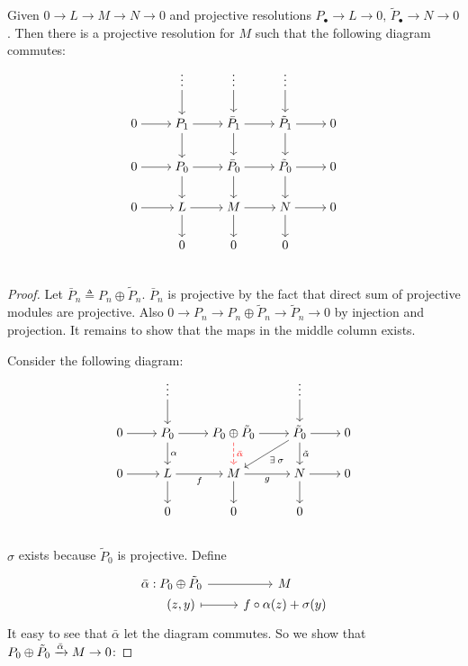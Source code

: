 \begin{theorem} \label{thm:horseshoe-lemma}
  Given $0 \to L \to M \to N \to 0$ and projective resolutions
  $P_\bullet \to L \to 0, \, \tilde P_\bullet \to N \to 0$.
  Then there is a projective resolution for $M$ such that
  the following diagram commutes:
  \[ \begin{tikzcd}[cramped]
      & \vdots \ar[d] & \vdots \ar[d] & \vdots \ar[d] & \\
      0 \ar[r] & P_1 \ar[r] \ar[d] & \bar P_1 \ar[r] \ar[d] & \tilde P_1 \ar[r] \ar[d] & 0 \\
      0 \ar[r] & P_0 \ar[r] \ar[d] & \bar P_0 \ar[r] \ar[d] & \tilde P_0 \ar[r] \ar[d] & 0 \\
      0 \ar[r] & L   \ar[r] \ar[d] & M        \ar[r] \ar[d] & N          \ar[r] \ar[d] & 0 \\
               & 0 & 0 & 0 & \\
  \end{tikzcd} \]

  \begin{proof}
    Let $\bar P_n \triangleq P_n \oplus \tilde P_n$. $\bar P_n$ is projective
    by the fact that direct sum of projective modules are projective. Also
    $0 \to P_n \to P_n \oplus \tilde P_n \to \tilde P_n \to 0$ by
    injection and projection. It remains to show that the
    maps in the middle column exists.

    Consider the following diagram:
    \[ \begin{tikzcd}[cramped]
        & \vdots \ar[d] &  & \vdots \ar[d] & \\
        0 \ar[r] &
        P_0 \ar[r] \ar[d, "\alpha"] &
        P_0 \oplus \tilde P_0 \ar[r] \ar[d, red, "\bar \alpha" red, dashed] &
        \tilde P_0 \ar[r] \ar[d, "\tilde \alpha"] \ar[ld, "\exists \sigma"] & 0 \\
        0 \ar[r] & L \ar[r, "f"'] \ar[d] &
        M \ar[r, "g"'] \ar[d] &
        N \ar[r] \ar[d] & 0 \\
        & 0 & 0 & 0 & \\
    \end{tikzcd} \]
    $\sigma$ exists because $\tilde P_0$ is projective.
    Define
    \[ \begin{tikzcd}[row sep=0pt]
        \bar\alpha : &[-3em] P_0 \oplus \tilde P_0 \ar[r] & M \\
                     &[-3em] (z, y) \ar[r, mapsto] & f \circ \alpha(z) + \sigma(y)
    \end{tikzcd} \]
    It easy to see that $\bar \alpha$ let the diagram commutes.
    So we show that $P_0 \oplus \tilde P_0 \xrightarrow{\bar \alpha} M \to 0$:


\end{proof}
\end{theorem}
